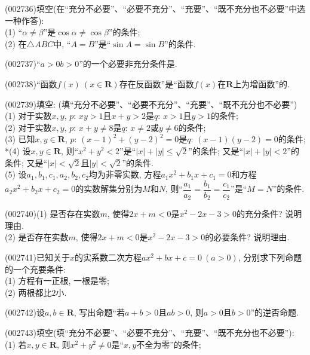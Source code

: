 \item (002736)填空(在``充分不必要''、``必要不充分''、``充要''、``既不充分也不必要''中选一种作答):\\
(1) ``$\alpha \ne \beta$''是$\cos \alpha \ne \cos \beta$''的条件;\\
(2) 在$\triangle ABC$中, ``$A=B$''是``$\sin A=\sin B$''的条件.
\item (002737)``$a>0b>0$''的一个必要非充分条件是.
\item (002738)``函数$f(x)\ (x\in \mathbf{R})$存在反函数''是``函数$f(x)$在$\mathbf{R}$上为增函数''的.
\item (002739)填空: (填``充分不必要''、``必要不充分''、``充要''、``既不充分也不必要'')\\ 
(1) 对于实数$x,y$, $p$: $xy>1$且$x+y>2$是$q$: $x>1$且$y>1$的条件;\\
(2) 对于实数$x,y$, $p$: $x+y\ne 8$是$q$: $x\ne 2$或$y\ne 6$的条件;\\
(3) 已知$x,y\in \mathbf{R}$, $p$: $(x-1)^2+(y-2)^2=0$是$q$: $(x-1)(y-2)=0$的条件;\\
*(4) 设$x,y\in \mathbf{R}$, 则``$x^2+y^2<2$''是``$|x|+|y|\le \sqrt2$''的条件; 又是``$|x|+|y|<2$''的条件; 又是``$|x|<\sqrt2$且$|y|<\sqrt2$''的条件.\\
(5) 设$a_1,b_1,c_1,a_2,b_2,c_2$均为非零实数, 方程$a_1x^2+b_1x+c_1=0$和方程$a_2x^2+b_2x+c_2=0$的实数解集分别为$M$和$N$, 则``$\dfrac{a_1}{a_2}=\dfrac{b_1}{b_2}=\dfrac{c_1}{c_2}$''是``$M=N$''的条件.
\item (002740)(1) 是否存在实数$m$, 使得$2x+m<0$是${x^2}-2x-3>0$的充分条件? 说明理由.\\
(2) 是否存在实数$m$, 使得$2x+m<0$是$x^2-2x-3>0$的必要条件? 说明理由.
\item (002741)已知关于$x$的实系数二次方程$a x^2 +bx+c=0\ (a>0)$, 分别求下列命题的一个充要条件:\\
(1) 方程有一正根, 一根是零;\\
(2) 两根都比$2$小.
\item (002742)设$a,b\in \mathbf{R}$, 写出命题``若$a+b>0$且$ab>0$, 则$a>0$且$b>0$''的逆否命题.
\item (002743)填空(填``充分不必要''、``必要不充分''、``充要''、``既不充分也不必要''):\\
(1) 若$x,y\in \mathbf{R}$, 则$x^2+y^2 \ne 0$是``$x,y$不全为零''的条件;\\
